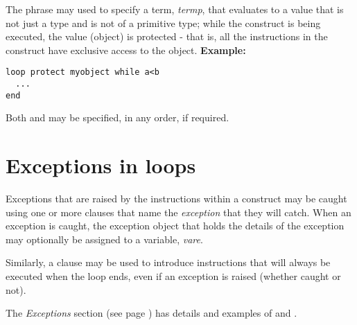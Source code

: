 The  phrase may used to specify a term,
\emph{termp}, that evaluates to a value that is not just a type and
is not of a primitive type;
while the  construct is being executed, the value (object)
is protected - that is, all the instructions in the 
construct have exclusive access to the object.
 \textbf{Example:}
\begin{lstlisting}
loop protect myobject while a<b
  ...
end
\end{lstlisting}
 
Both  and  may be specified, in any order,
if required.
\section{Exceptions in loops}
 
Exceptions that are raised by the instructions within a 
construct may be caught using one or more  clauses that
name the \emph{exception} that they will catch.  When an exception is
caught, the exception object that holds the details of the exception may
optionally be assigned to a variable, \emph{vare}.
 
Similarly, a  clause may be used to introduce
instructions that will always be executed when the loop ends, even if an
exception is raised (whether caught or not).
 
The  \emph{Exceptions} section (see page \pageref{refexcep})  has details and
examples of  and .
